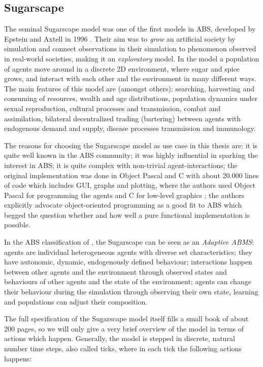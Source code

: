 \subsection{Sugarscape}
\label{sec:sugarscape}

The seminal Sugarscape model was one of the first models in ABS, developed by Epstein and Axtell in 1996 \cite{epstein_growing_1996}. Their aim was to \textit{grow} an artificial society by simulation and connect observations in their simulation to phenomenon observed in real-world societies, making it an \textit{exploratory} model. In the model a population of agents move around in a discrete 2D environment, where sugar and spice grows, and interact with each other and the environment in many different ways. The main features of this model are (amongst others): searching, harvesting and consuming of resources, wealth and age distributions, population dynamics under sexual reproduction, cultural processes and transmission, combat and assimilation, bilateral decentralized trading (bartering) between agents with endogenous demand and supply, disease processes transmission and immunology.

The reasons for choosing the Sugarscape model as use case in this thesis are: it is quite well known in the ABS community; it was highly influential in sparking the interest in ABS; it is quite complex with non-trivial agent-interactions; the original implementation was done in Object Pascal and C with about 20.000 lines of code which includes GUI, graphs and plotting, where the authors used Object Pascal for programming the agents and C for low-level graphics \cite{axtell_aligning_1996}; the authors explicitly advocate object-oriented programming as a good fit to ABS which begged the question whether and how well a pure functional implementation is possible. 

In the ABS classification of \cite{macal_everything_2016}, the Sugarscape can be seen as an \textit{Adaptive ABMS}: agents are individual heterogeneous agents with diverse set characteristics; they have autonomic, dynamic, endogenously defined behaviour; interactions happen between other agents and the environment through observed states and behaviours of other agents and the state of the environment; agents can change their behaviour during the simulation through observing their own state, learning and populations can adjust their composition.

The full specification of the Sugarscape model itself fills a small book \cite{epstein_growing_1996} of about 200 pages, so we will only give a very brief overview of the model in terms of actions which happen. Generally, the model is stepped in discrete, natural number time steps, also called ticks, where in each tick the following actions happens:

